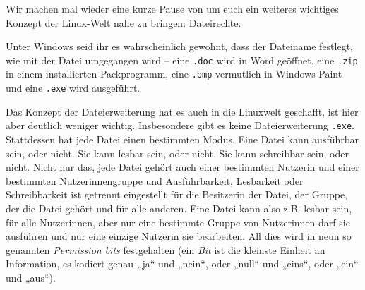 
Wir machen mal wieder eine kurze Pause von \Cpp um euch ein weiteres wichtiges
Konzept der Linux-Welt nahe zu bringen: Dateirechte.

Unter Windows seid ihr es wahrscheinlich gewohnt, dass der Dateiname festlegt,
wie mit der Datei umgegangen wird -- eine \texttt{.doc} wird in Word geöffnet,
eine \texttt{.zip} in einem installierten Packprogramm, eine \texttt{.bmp}
vermutlich in Windows Paint und eine \texttt{.exe} wird ausgeführt.

Das Konzept der Dateierweiterung hat es auch in die Linuxwelt geschafft, ist
hier aber deutlich weniger wichtig. Insbesondere gibt es keine Dateierweiterung
\texttt{.exe}. Stattdessen hat jede Datei einen bestimmten Modus. Eine Datei
kann ausführbar sein, oder nicht. Sie kann lesbar sein, oder nicht. Sie kann
schreibbar sein, oder nicht. Nicht nur das, jede Datei gehört auch einer
bestimmten Nutzerin und einer bestimmten Nutzerinnengruppe und Ausführbarkeit,
Lesbarkeit oder Schreibbarkeit ist getrennt eingestellt für die Besitzerin der
Datei, der Gruppe, der die Datei gehört und für alle anderen. Eine Datei kann
also z.B. lesbar sein, für alle Nutzerinnen, aber nur eine bestimmte Gruppe von
Nutzerinnen darf sie ausführen und nur eine einzige Nutzerin sie bearbeiten. All
dies wird in neun so genannten \emph{Permission bits} festgehalten (ein
\emph{Bit} ist die kleinste Einheit an Information, es kodiert genau „ja“ und
„nein“, oder „null“ und „eins“, oder „ein“ und „aus“).

